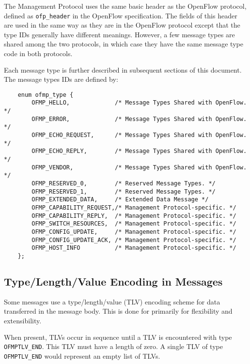 \documentclass[11pt,a4paper]{article}
\begin{document}
   The Management Protocol uses the same basic header as
   the OpenFlow protocol, defined as \verb|ofp_header| in the OpenFlow
   specification.  The fields of this header are used in the same way
   as they are in the OpenFlow protocol except that the type IDs
   generally have different meanings.  However, a few message types
   are shared among the two protocols, in which case they have the
   same message type code in both protocols.

   Each message type is further described in subsequent sections of
   this document. The message types IDs are defined by:

{ \footnotesize

\begin{verbatim}
    enum ofmp_type {
        OFMP_HELLO,             /* Message Types Shared with OpenFlow. */
        OFMP_ERROR,             /* Message Types Shared with OpenFlow. */
        OFMP_ECHO_REQUEST,      /* Message Types Shared with OpenFlow. */
        OFMP_ECHO_REPLY,        /* Message Types Shared with OpenFlow. */
        OFMP_VENDOR,            /* Message Types Shared with OpenFlow. */
        OFMP_RESERVED_0,        /* Reserved Message Types. */
        OFMP_RESERVED_1,        /* Reserved Message Types. */
        OFMP_EXTENDED_DATA,     /* Extended Data Message */
        OFMP_CAPABILITY_REQUEST,/* Management Protocol-specific. */
        OFMP_CAPABILITY_REPLY,  /* Management Protocol-specific. */
        OFMP_SWITCH_RESOURCES,  /* Management Protocol-specific. */
        OFMP_CONFIG_UPDATE,     /* Management Protocol-specific. */
        OFMP_CONFIG_UPDATE_ACK, /* Management Protocol-specific. */
        OFMP_HOST_INFO          /* Management Protocol-specific. */
    };

\end{verbatim}


}

\subsection{Type/Length/Value Encoding in Messages}
\label{sec-2.4}


   Some messages use a type/length/value (TLV) encoding scheme for
   data transferred in the message body.  This is done for primarily
   for flexibility and extensibility.

   When present, TLVs occur in sequence until a TLV is encountered
   with type \verb|OFMPTLV_END|.  This TLV must have a length of zero.  A
   single TLV of type \verb|OFMPTLV_END| would represent an empty list of
   TLVs.
\end{document}
